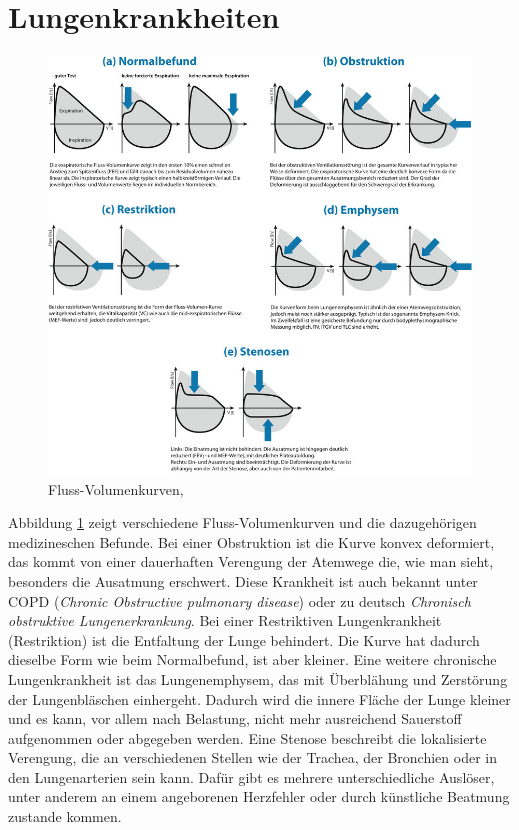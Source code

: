 \documentclass[11pt]{scrartcl}
\begin{document}

    \section{Lungenkrankheiten} \label{Lungenkrankheiten}

    \begin{figure}[H]
        \includegraphics[width=15cm]{Dateien/Flusskurve.jpeg}
        \caption{Fluss-Volumenkurven, \cite{Flusskurven}}
        \label{fig:flusskurve}
    \end{figure}

    Abbildung \ref{fig:flusskurve} zeigt verschiedene Fluss-Volumenkurven und die dazugehörigen medizineschen Befunde.
    Bei einer Obstruktion ist die Kurve konvex deformiert, das kommt von einer dauerhaften Verengung der Atemwege die,
    wie man sieht, besonders die Ausatmung erschwert.
    Diese Krankheit ist auch bekannt unter COPD (\emph{Chronic Obstructive pulmonary disease}) oder zu deutsch
    \emph{Chronisch obstruktive Lungenerkrankung}.
    Bei einer Restriktiven Lungenkrankheit (Restriktion) ist die Entfaltung der Lunge behindert.
    Die Kurve hat dadurch dieselbe Form wie beim Normalbefund, ist aber kleiner.
    Eine weitere chronische Lungenkrankheit ist das Lungenemphysem, das mit Überblähung und Zerstörung der
    Lungenbläschen einhergeht.
    Dadurch wird die innere Fläche der Lunge kleiner und es kann, vor allem nach Belastung, nicht mehr ausreichend
    Sauerstoff aufgenommen oder abgegeben werden.
    Eine Stenose beschreibt die lokalisierte Verengung, die an verschiedenen Stellen wie der Trachea, der
    Bronchien oder in den Lungenarterien sein kann.
    Dafür gibt es mehrere unterschiedliche Auslöser, unter anderem an einem angeborenen Herzfehler oder durch
    künstliche Beatmung zustande kommen.
    \pagebreak
\end{document}
